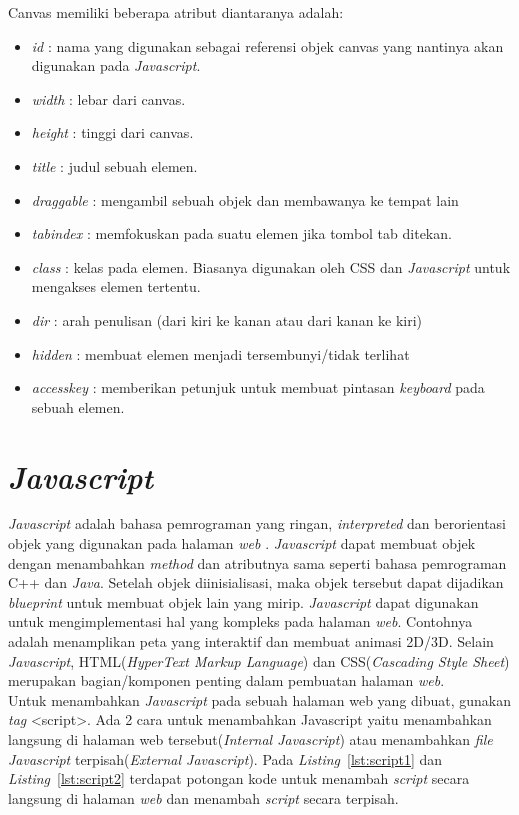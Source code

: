 Canvas memiliki beberapa atribut diantaranya adalah: 
\begin{itemize}
	\item \textit{id} : nama yang digunakan sebagai referensi objek canvas yang nantinya akan digunakan pada \textit{Javascript}.
	\item \textit{width} : lebar dari canvas.
	\item \textit{height} : tinggi dari canvas.
	\item \textit{title} : judul sebuah elemen.
	\item \textit{draggable} : mengambil sebuah objek dan membawanya ke tempat lain
	\item \textit{tabindex} : memfokuskan pada suatu elemen jika tombol tab ditekan.
	\item \textit{class} : kelas pada elemen. Biasanya digunakan oleh CSS dan \textit{Javascript} untuk mengakses elemen tertentu.
	\item \textit{dir} : arah penulisan (dari kiri ke kanan atau dari kanan ke kiri)
	\item \textit{hidden} : membuat elemen menjadi tersembunyi/tidak terlihat
	\item \textit{accesskey} : memberikan petunjuk untuk membuat pintasan \textit{keyboard} pada sebuah elemen.
\end{itemize}


\section{\textit{Javascript}}
\label{sec:Javascript}
\textit{Javascript} adalah bahasa pemrograman yang ringan, \textit{interpreted} dan berorientasi objek yang digunakan pada halaman \textit{web} \cite{MDN:05:Web}. \textit{Javascript} dapat membuat objek dengan menambahkan \textit{method} dan atributnya sama seperti bahasa pemrograman C++ dan \textit{Java}. Setelah objek diinisialisasi, maka objek tersebut dapat dijadikan \textit{blueprint} untuk membuat objek lain yang mirip. \textit{Javascript} dapat digunakan untuk mengimplementasi hal yang kompleks pada halaman \textit{web}. Contohnya adalah menamplikan peta yang interaktif dan membuat animasi 2D/3D. Selain \textit{Javascript}, HTML(\textit{HyperText Markup Language}) dan CSS(\textit{Cascading Style Sheet}) merupakan bagian/komponen penting dalam pembuatan halaman \textit{web}.\\

Untuk menambahkan \textit{Javascript} pada sebuah halaman web yang dibuat, gunakan \textit{tag} <script>. Ada 2 cara untuk menambahkan Javascript yaitu menambahkan langsung di halaman web tersebut(\textit{Internal Javascript}) atau menambahkan \textit{file Javascript} terpisah(\textit{External Javascript}). Pada \textit{Listing}~\ref{lst:script1} dan \textit{Listing}~\ref{lst:script2} terdapat potongan kode untuk menambah \textit{script} secara langsung di halaman \textit{web} dan menambah \textit{script} secara terpisah.

